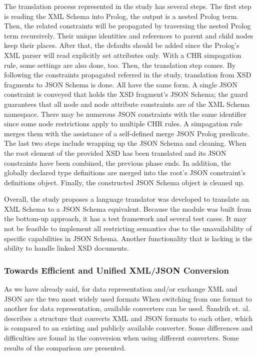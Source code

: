 The translation process represented in the study has several steps. The first
step is reading the XML Schema into Prolog, the output is a nested Prolog term.
Then, the related constraints will be propagated by traversing the nested Prolog
term recursively. Their unique identities and references to parent and child
nodes keep their places. After that, the defaults should be added since the
Prolog’s XML parser will read explicitly set attributes only. With a CHR
simpagation rule, some settings are also done, too. Then, the translation step
comes. By following the constraints propagated referred in the study,
translation from XSD fragments to JSON Schema is done. All have the same form. A
single JSON constraint is conveyed that holds the XSD fragment's JSON Schema;
the guard guarantees that all node and node attribute constraints are of the XML
Schema namespace. There may be numerous JSON constraints with the same
identifier since some node restrictions apply to multiple CHR rules. A
simpagation rule merges them with the assistance of a self-defined merge JSON
Prolog predicate. The last two steps include wrapping up the JSON Schema and
cleaning. When the root element of the provided XSD has been translated and its
JSON constraints have been combined, the previous phase ends. In addition, the
globally declared type definitions are merged into the root's JSON constraint's
definitions object. Finally, the constructed JSON Schema object is cleaned up.

Overall, the study proposes a language translator was developed to translate an
XML Schema to a JSON Schema equivalent. Because the module was built from the
bottom-up approach, it has a test framework and several test cases. It may not
be feasible to implement all restricting semantics due to the unavailability of
specific capabilities in JSON Schema. Another functionality that is lacking is
the ability to handle linked XSD documents.

\subsubsection{Towards Efficient and Unified XML/JSON Conversion}
As we have already said, for data representation and/or exchange XML and JSON
are the two most widely used formats When switching from one format to another
for data representation, available converters can be used. Šandrih et. al.
\autocite{Sandrih2017} describes a structure that converts XML and JSON formats
to each other, which is compared to an existing and publicly available
converter. Some differences and difficulties are found in the conversion when
using different converters. Some results of the comparison are presented.

